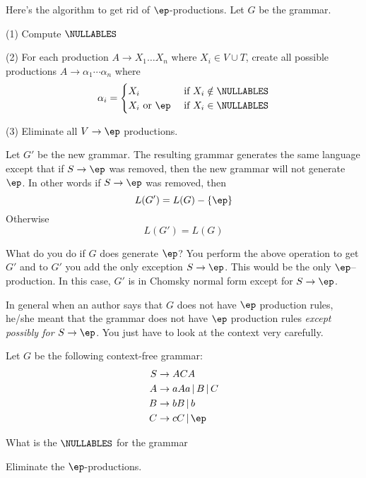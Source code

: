 Here's the algorithm to get rid of $\ep$-productions.
Let $G$ be the grammar.
\begin{mylist}
 \item[(1)] Compute $\NULLABLES$
 \item[(2)] For each production $A \rightarrow X_1 \ldots X_n$
 where $X_i \in V \cup T$, create all possible productions $A \rightarrow
 \alpha_1 \cdots \alpha_n$ where
 \[
 \alpha_i =
 \begin{cases}
   X_i & \text{ if $X_i \notin \NULLABLES$} \\
   X_i \text{ or } \ep & \text{ if $X_i \in \NULLABLES$}
 \end{cases}
 \]
 \item[(3)] Eliminate all $V \rightarrow \ep$ productions.
\end{mylist}
Let $G'$ be the new grammar.
The resulting grammar generates the same language except that 
if $S \rightarrow \ep$ was removed, then the new grammar
will not generate $\ep$.
In other words if $S \rightarrow \ep$ was removed, then
\[
L(G') = L(G) - \{\ep\}
\]
Otherwise
\[
L(G') = L(G)
\]

What do you do if $G$ does generate $\ep$?
You perform the above operation to get $G'$ and to $G'$ you add the
only exception $S \rightarrow \ep$.
This would be the only $\ep$--production.
In this case, $G'$ is in Chomsky normal form except for
$S \rightarrow \ep$.

In general when 
an author says that $G$ does not have $\ep$ production rules,
he/she meant that the grammar does not have $\ep$ production rules
\textit{except possibly for $S \rightarrow \ep$}.
You just have to look at the context very carefully.


\newpage
\begin{eg}
Let $G$ be the following context-free grammar:
\begin{align*}
  S &\rightarrow ACA \\
  A &\rightarrow aAa \,|\, B \,|\, C \\
  B &\rightarrow bB \,|\, b \\
  C &\rightarrow cC \,|\, \ep 
\end{align*}
\begin{tightlist}
\item What is the $\NULLABLES$ for the grammar
\item Eliminate the $\ep$-productions.
\end{tightlist}
\end{eg}

